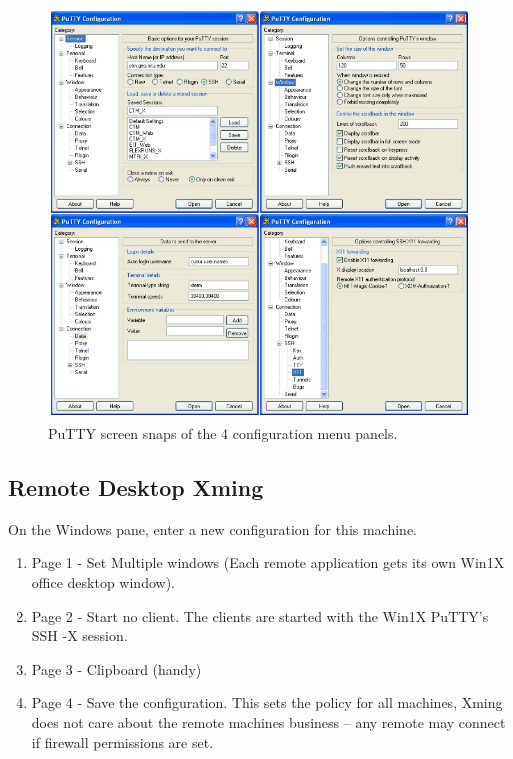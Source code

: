 \begin{figure}[h!]
\centering
\includegraphics[width=.7\textwidth]{images/PuYYTXming.png}
\caption{PuTTY screen snaps of the 4 configuration menu panels.} %
\label{figure:PuYYTXming}
\end{figure}



\newpage
\subsection{Remote Desktop Xming}


On the Windows pane, enter a new configuration for this machine.

\vspace{-.15cm}
\begin{enumerate}\addtolength{\itemsep}{-0.5\baselineskip}
   \item Page 1 - Set Multiple windows (Each remote application gets
     its own Win1X office desktop window).
   \item Page 2 - Start no client. The clients are started with the
     Win1X PuTTY's SSH -X session.
   \item  Page 3 - Clipboard (handy)
   \item Page 4 - Save the configuration. This sets the policy for all
     machines, Xming does not care about the remote machines business
     -- any remote may connect if firewall permissions are set.
\end{enumerate}


